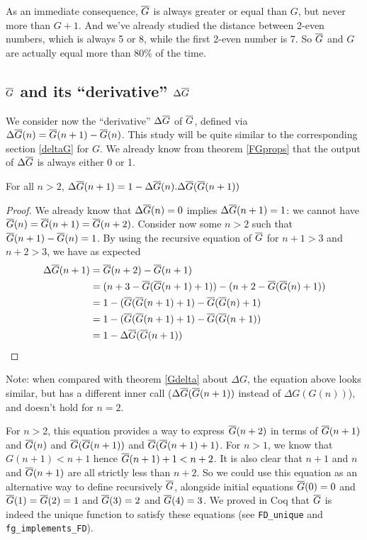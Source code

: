 \documentclass[a4paper,11pt]{article}
\begin{document}
As an immediate consequence, $\overline{G}$ is always greater or equal
than $G$, but never more than $G+1$. And we've already studied
the distance between 2-even numbers, which is always 5 or 8,
while the first 2-even number is 7. So $\overline{G}$ and $G$ are actually
equal more than 80\% of the time.

\subsection{$\overline{G}$ and its ``derivative'' $\Delta\overline{G}$}

We consider now the ``derivative'' $\Delta\overline{G}$ of $\overline{G}$, defined via
$\Delta \overline{G}(n) = \overline{G}(n+1)-\overline{G}(n)$. This study will be quite
similar to the corresponding section \ref{deltaG} for $G$.
We already know from theorem
\ref{FGprops} that the output of $\Delta\overline{G}$ is always either 0 or 1.

\begin{theorem}\label{FGdelta}
  For all $n>2$, $\Delta\overline{G}(n+1) = 1 - \Delta\overline{G}(n).\Delta\overline{G}(\overline{G}(n+1))$
\end{theorem}
\begin{proof}
We already know that $\Delta\overline{G}(n)=0$ implies $\Delta\overline{G}(n+1)=1$:
we cannot have $\overline{G}(n)=\overline{G}(n+1)=\overline{G}(n+2)$.
Consider now some $n>2$ such that
$\overline{G}(n+1)-\overline{G}(n)=1$. By using the recursive equation of $\overline{G}$
for $n+1>3$ and $n+2>3$, we have as expected
\begin{align*}
 \Delta\overline{G}(n+1) & = \overline{G}(n+2)-\overline{G}(n+1) \\
                & =(n+3-\overline{G}(\overline{G}(n+1)+1))-(n+2-\overline{G}(\overline{G}(n)+1)) \\
                & = 1 - (\overline{G}(\overline{G}(n+1)+1)-\overline{G}(\overline{G}(n)+1) \\
                & = 1 - (\overline{G}(\overline{G}(n+1)+1)-\overline{G}(\overline{G}(n+1)) \\
                & = 1 - \Delta\overline{G}(\overline{G}(n+1))
\end{align*}
\end{proof}

Note: when compared with theorem \ref{Gdelta} about $\Delta G$, 
the equation
above looks similar, but has a different inner call
($\Delta\overline{G}(\overline{G}(n+1))$ instead of $\Delta G(G(n))$), and doesn't
hold for $n=2$.

For $n>2$, this equation provides a way to express $\overline{G}(n+2)$ in terms of
$\overline{G}(n+1)$ and $\overline{G}(n)$ and $\overline{G}(\overline{G}(n+1))$ and $\overline{G}(\overline{G}(n+1)+1)$.
For $n>1$, we know that $G(n+1)<n+1$ hence $\overline{G}(n+1)+1<n+2$.
It is also clear that $n+1$ and $n$ and $\overline{G}(n+1)$ are all
strictly less than $n+2$.
So we could use this equation as an alternative way to define
recursively $\overline{G}$,
alongside  initial equations $\overline{G}(0)=0$ and $\overline{G}(1)=\overline{G}(2)=1$ and
$\overline{G}(3)=2$ and $\overline{G}(4)=3$.
We proved in Coq that $\overline{G}$ is indeed the unique function to
satisfy these equations (see {\tt FD\_unique} and
{\tt  fg\_implements\_FD}).
\end{document}
